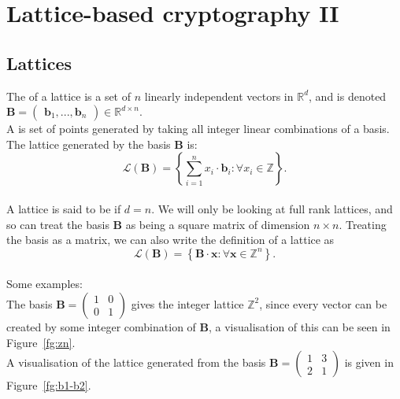 



\section{Lattice-based cryptography II}
\label{sec:20}

\subsection{Lattices}
The  of a lattice is a set of $n$ linearly independent vectors in $\mathbb{R}^d$, and is denoted $\textbf{B} = \begin{pmatrix}\textbf{b}_1,...,\textbf{b}_n\end{pmatrix} \in \mathbb{R}^{d\times n}$.
\\
A  is set of points generated by taking all integer linear combinations of a basis. The lattice generated by the basis $\textbf{B}$ is: $$\mathcal{L}(\textbf{B}) = \left\{\sum_{i = 1}^{n}x_{i}\cdot\textbf{b}_{i}:\forall x_{i}\in\mathbb{Z}\right\}.$$
\\
A lattice is said to be  if $d = n$. We will only be looking at full rank lattices, and so can treat the basis $\textbf{B}$ as being a square matrix of dimension $n\times n$. Treating the basis as a matrix, we can also write the definition of a lattice as $$\mathcal{L}(\textbf{B}) = \left\{ \textbf{B}\cdot\textbf{x}:\forall\textbf{x}\in\mathbb{Z}^{n}\right\}.$$
\\
Some examples:
\\
The basis $\textbf{B} = \begin{pmatrix}1 & 0 \\ 0 & 1 \end{pmatrix}$ gives the integer lattice $\mathbb{Z}^2$, since every vector can be created by some integer combination of $\textbf{B}$, a visualisation of this can be seen in Figure~\ref{fg:zn}.
\\
A visualisation of the lattice generated from the basis $\textbf{B} = \begin{pmatrix}1 & 3 \\ 2 & 1\end{pmatrix}$ is given in Figure~\ref{fg:b1-b2}.
